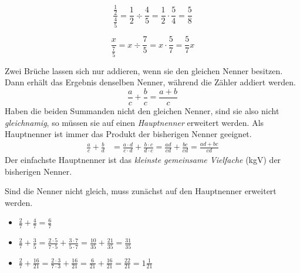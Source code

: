 \begin{bsp}
 \begin{equation*}
  \frac{\frac{1}{2}}{\frac{4}{5}} = \frac{1}{2}\div \frac{4}{5} = \frac{1}{2}\cdot \frac{5}{4} = \frac{5}{8}
 \end{equation*}
\end{bsp}

\begin{bsp}
 \begin{equation*}
  \frac{x}{\frac{7}{5}} = x\div \frac{7}{5} = x \cdot \frac{5}{7}  = \frac{5}{7}x
 \end{equation*}
\end{bsp}

\begin{regel}
 Zwei Brüche lassen sich nur addieren, wenn sie den gleichen Nenner besitzen. Dann erhält das Ergebnis denselben Nenner, während die Zähler addiert werden.
 \begin{equation*}
  \frac{a}{c} + \frac{b}{c} = \frac{a+b}{c}
 \end{equation*}
 Haben die beiden Summanden nicht den gleichen Nenner, sind sie also nicht \emph{gleichnamig}, so müssen sie auf einen \emph{Hauptnenner} erweitert werden. Als Hauptnenner ist immer das Produkt der bisherigen Nenner geeignet.
 \begin{align*}
  \frac{a}{c} + \frac{b}{d} &= \frac{a\cdot d}{c\cdot d} + \frac{b \cdot c}{d \cdot c} = \frac{ad}{cd} + \frac{bc}{cd} = \frac{ad+bc}{cd}
 \end{align*}
 Der einfachste Hauptnenner ist das \emph{kleinste gemeinsame Vielfache} (kgV) der bisherigen Nenner.
\end{regel}

\begin{bsp}
Sind die Nenner nicht gleich, muss zunächst auf den Hauptnenner erweitert werden.
 \begin{itemize}
  \item \( \frac{2}{7} + \frac{4}{7} = \frac{6}{7}\)
  \item \( \frac{2}{7} + \frac{3}{5} = \frac{2\cdot 5}{7\cdot 5} + \frac{3\cdot 7}{5\cdot 7} = \frac{10}{35} + \frac{21}{35} = \frac{31}{35}\)
  \item \( \frac{2}{7} + \frac{16}{21} = \frac{2\cdot 3}{7\cdot 3} + \frac{16}{21} = \frac{6}{21} + \frac{16}{21} = \frac{22}{21}=1\frac{1}{21}\)
 \end{itemize}

\end{bsp}


